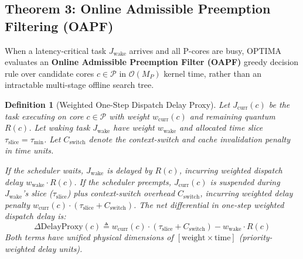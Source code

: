 \documentclass[conference]{IEEEtran}
\newtheorem{definition}{Definition}
\begin{document}
\subsection{Theorem 3: Online Admissible Preemption Filtering (OAPF)}
\label{sec:oapf_theory}
When a latency-critical task $J_{\mathrm{wake}}$ arrives and all P-cores are busy, OPTIMA evaluates an \textbf{Online Admissible Preemption Filter (OAPF)} greedy decision rule over candidate cores $c \in \mathcal{P}$ in $\mathcal{O}(M_P)$ kernel time, rather than an intractable multi-stage offline search tree.

\begin{definition}[Weighted One-Step Dispatch Delay Proxy]
\label{def:deltacost}
Let $J_{\mathrm{curr}}(c)$ be the task executing on core $c \in \mathcal{P}$ with weight $w_{\mathrm{curr}}(c)$ and remaining quantum $R(c)$. Let waking task $J_{\mathrm{wake}}$ have weight $w_{\mathrm{wake}}$ and allocated time slice $\tau_{\mathrm{slice}} = \tau_{\min}$. Let $C_{\mathrm{switch}}$ denote the context-switch and cache invalidation penalty in time units.

If the scheduler waits, $J_{\mathrm{wake}}$ is delayed by $R(c)$, incurring weighted dispatch delay $w_{\mathrm{wake}} \cdot R(c)$. If the scheduler preempts, $J_{\mathrm{curr}}(c)$ is suspended during $J_{\mathrm{wake}}$'s slice ($\tau_{\mathrm{slice}}$) plus context-switch overhead $C_{\mathrm{switch}}$, incurring weighted delay penalty $w_{\mathrm{curr}}(c) \cdot (\tau_{\mathrm{slice}} + C_{\mathrm{switch}})$. The net differential in one-step weighted dispatch delay is:
\begin{equation}
\label{eq:deltacost_paper}
\Delta\mathrm{DelayProxy}(c) \triangleq w_{\mathrm{curr}}(c) \cdot (\tau_{\mathrm{slice}} + C_{\mathrm{switch}}) - w_{\mathrm{wake}} \cdot R(c)
\end{equation}
Both terms have unified physical dimensions of $[\mathrm{weight} \times \mathrm{time}]$ (priority-weighted delay units).
\end{definition}
\end{document}
